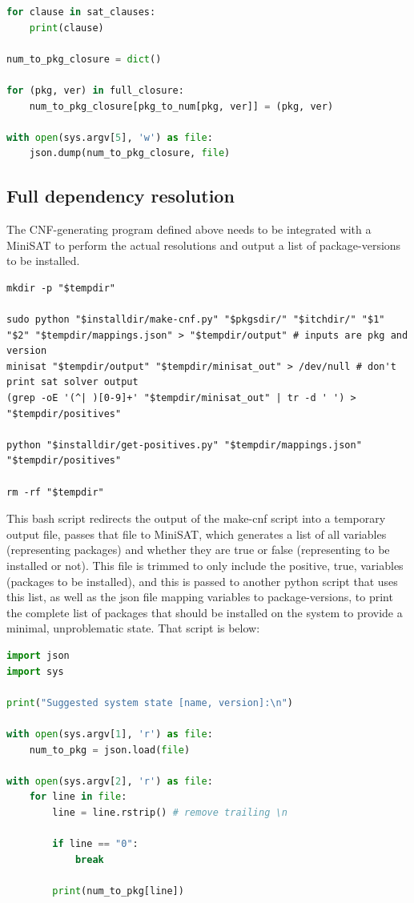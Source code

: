 \documentclass[10pt]{article}
\begin{document}
\begin{lstlisting}[language=python]
for clause in sat_clauses:
    print(clause)

num_to_pkg_closure = dict()

for (pkg, ver) in full_closure:
    num_to_pkg_closure[pkg_to_num[pkg, ver]] = (pkg, ver)

with open(sys.argv[5], 'w') as file:
    json.dump(num_to_pkg_closure, file)
\end{lstlisting}

\subsection{Full dependency resolution}

The CNF-generating program defined above needs to be integrated with a MiniSAT to perform the actual resolutions and output a list of package-versions to be installed.

\begin{lstlisting}
mkdir -p "$tempdir"

sudo python "$installdir/make-cnf.py" "$pkgsdir/" "$itchdir/" "$1" "$2" "$tempdir/mappings.json" > "$tempdir/output" # inputs are pkg and version
minisat "$tempdir/output" "$tempdir/minisat_out" > /dev/null # don't print sat solver output
(grep -oE '(^| )[0-9]+' "$tempdir/minisat_out" | tr -d ' ') > "$tempdir/positives"

python "$installdir/get-positives.py" "$tempdir/mappings.json" "$tempdir/positives"

rm -rf "$tempdir"
\end{lstlisting}

This bash script redirects the output of the make-cnf script into a temporary output file, passes that file to MiniSAT, which generates a list of all variables (representing packages) and whether they are true or false (representing to be installed or not). This file is trimmed to only include the positive, true, variables (packages to be installed), and this is passed to another python script that uses this list, as well as the json file mapping variables to package-versions, to print the complete list of packages that should be installed on the system to provide a minimal, unproblematic state. That script is below:

\begin{lstlisting}[language=python]
import json
import sys

print("Suggested system state [name, version]:\n")

with open(sys.argv[1], 'r') as file:
    num_to_pkg = json.load(file)

with open(sys.argv[2], 'r') as file:
    for line in file:
        line = line.rstrip() # remove trailing \n

        if line == "0":
            break

        print(num_to_pkg[line])
\end{lstlisting}
\end{document}
